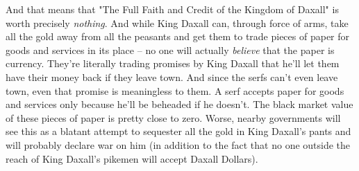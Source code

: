 And that means that "The Full Faith and Credit of the Kingdom of Daxall" is worth precisely \textit{nothing}. And while King Daxall can, through force of arms, take all the gold away from all the peasants and get them to trade pieces of paper for goods and services in its place -- no one will actually \textit{believe} that the paper is currency. They're literally trading promises by King Daxall that he'll let them have their money back if they leave town. And since the serfs can't even leave town, even that promise is meaningless to them. A serf accepts paper for goods and services only because he'll be beheaded if he doesn't. The black market value of these pieces of paper is pretty close to zero. Worse, nearby governments will see this as a blatant attempt to sequester all the gold in King Daxall's pants and will probably declare war on him (in addition to the fact that no one outside the reach of King Daxall's pikemen will accept Daxall Dollars).
